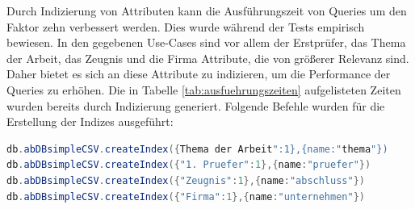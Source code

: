 Durch Indizierung von Attributen kann die Ausführungszeit von Queries um den Faktor zehn verbessert werden. Dies wurde während der Tests empirisch bewiesen. In den gegebenen Use-Cases sind vor allem der Erstprüfer, das Thema der Arbeit, das Zeugnis und die Firma Attribute, die von größerer Relevanz sind. Daher bietet es sich an diese Attribute zu indizieren, um die Performance der Queries zu erhöhen. Die in Tabelle \ref{tab:ausfuehrungszeiten} aufgelisteten Zeiten wurden bereits durch Indizierung generiert. Folgende Befehle wurden für die Erstellung der Indizes ausgeführt:

\begin{lstlisting}[caption={Befehle zur Erstellung der Indizierung},language=java,captionpos=t,numbers=none,basicstyle=\scriptsize,numberstyle=\tiny,breaklines=true]
db.abDBsimpleCSV.createIndex({Thema der Arbeit":1},{name:"thema"})
db.abDBsimpleCSV.createIndex({"1. Pruefer":1},{name:"pruefer"})
db.abDBsimpleCSV.createIndex({"Zeugnis":1},{name:"abschluss"})
db.abDBsimpleCSV.createIndex({"Firma":1},{name:"unternehmen"})
\end{lstlisting}\label{lst:query1}
